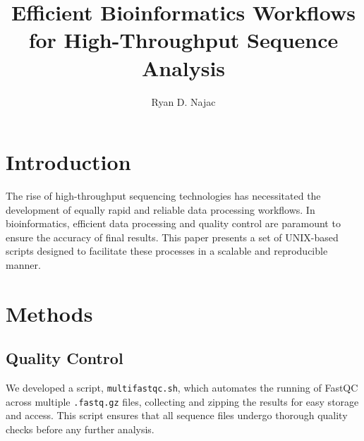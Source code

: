 \documentclass[unnumsec,webpdf,contemporary,large]{oup-authoring-template}%
\theoremstyle{thmstyleone}%
\begin{document}


\title[Efficient Bioinformatics Workflows]{Efficient Bioinformatics Workflows for High-Throughput Sequence Analysis}

\author[1,$\ast$]{Ryan D. Najac}


\address[1]{, , }





\maketitle

\section{Introduction}
The rise of high-throughput sequencing technologies has necessitated the development of equally rapid and reliable data processing workflows. In bioinformatics, efficient data processing and quality control are paramount to ensure the accuracy of final results. This paper presents a set of UNIX-based scripts designed to facilitate these processes in a scalable and reproducible manner.

\section{Methods}
\subsection{Quality Control}
We developed a script, \texttt{multifastqc.sh}, which automates the running of FastQC across multiple \texttt{.fastq.gz} files, collecting and zipping the results for easy storage and access. This script ensures that all sequence files undergo thorough quality checks before any further analysis.
\end{document}
